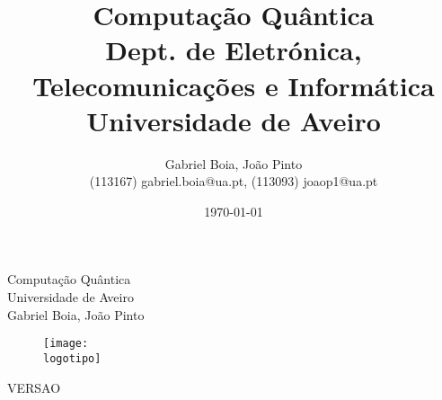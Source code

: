 \documentclass{report}
\begin{document}
%
\def\titulo{Computação Quântica}
\def\data{19/11/22}
\def\autores{Gabriel Boia, João Pinto}
\def\autorescontactos{(113167) gabriel.boia@ua.pt, (113093) joaop1@ua.pt}
\def\versao{VERSAO}
\def\departamento{Dept. de Eletrónica, Telecomunicações e Informática}
\def\empresa{Universidade de Aveiro}
\def\logotipo{ua.pdf}
%
%
\begin{titlepage}

\begin{center}
%
\vspace*{50mm}
%
{\Huge \titulo}\\ 
%
\vspace{10mm}
%
{\Large \empresa}\\
%
\vspace{10mm}
%
{\LARGE \autores}\\ 
%
\vspace{30mm}
%
\begin{figure}[h]
\center
\texttt{[image: \\logotipo]}
\end{figure}
%
\vspace{30mm}
\end{center}
%
\begin{flushright}
\versao
\end{flushright}
\end{titlepage}

\title{%
{\Huge\textbf{\titulo}}\\
{\Large \departamento\\ \empresa}
}
%
\author{%
    \autores \\
    \autorescontactos
}
%
\date{\today}
%
\maketitle

\end{document}

